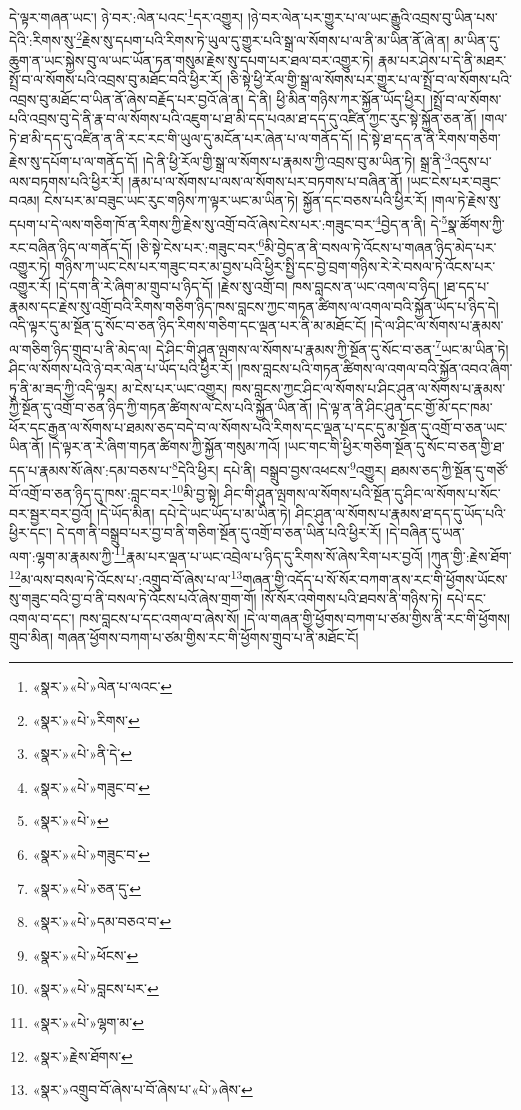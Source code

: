 དེ་ལྟར་གཞན་ཡང་། ཉེ་བར་:ལེན་པའང་\footnote{«སྣར་»«པེ་»ལེན་པ་ལའང་}དར་འགྱུར། །ཉེ་བར་ལེན་པར་གྱུར་པ་ལ་ཡང་རྒྱུའི་འབྲས་བུ་ཡིན་པས་དེའི་:རིགས་སུ་\footnote{«སྣར་»«པེ་»རིགས་}རྗེས་སུ་དཔག་པའི་རིགས་ཏེ་ཡུལ་དུ་གྱུར་པའི་སྒྲ་ལ་སོགས་པ་ལ་ནི་མ་ཡིན་ནོ་ཞེ་ན། མ་ཡིན་དུ་ཆུག་ན་ཡང་སྐྱེས་བུ་ལ་ཡང་ཡོན་ཏན་གསུམ་རྗེས་སུ་དཔག་པར་ཐལ་བར་འགྱུར་ཏེ། རྣམ་པར་ཤེས་པ་དེ་ནི་མཐར་སྤྲོ་བ་ལ་སོགས་པའི་འབྲས་བུ་མཐོང་བའི་ཕྱིར་རོ། །ཅི་སྟེ་ཕྱི་རོལ་གྱི་སྒྲ་ལ་སོགས་པར་གྱུར་པ་ལ་སྤྲོ་བ་ལ་སོགས་པའི་འབྲས་བུ་མཐོང་བ་ཡིན་ནོ་ཞེས་བརྗོད་པར་བྱའོ་ཞེ་ན། དེ་ནི། ཕྱི་མིན་གཉིས་ཀར་སྐྱོན་ཡོད་ཕྱིར། །སྤྲོ་བ་ལ་སོགས་པའི་འབྲས་བུ་དེ་ནི་རྣ་བ་ལ་སོགས་པའི་འཇུག་པ་ཐ་མི་དད་པའམ་ཐ་དད་དུ་འཛིན་ཀྱང་རུང་སྟེ་སྐྱོན་ཅན་ནོ། །གལ་ཏེ་ཐ་མི་དད་དུ་འཛིན་ན་ནི་རང་རང་གི་ཡུལ་དུ་མངོན་པར་ཞེན་པ་ལ་གནོད་དོ། །དེ་སྟེ་ཐ་དད་ན་ནི་རིགས་གཅིག་རྗེས་སུ་དཔོག་པ་ལ་གནོད་དོ། །དེ་ནི་ཕྱི་རོལ་གྱི་སྒྲ་ལ་སོགས་པ་རྣམས་ཀྱི་འབྲས་བུ་མ་ཡིན་ཏེ། སྒྲ་ནི་\footnote{«སྣར་»«པེ་»ནི་དེ་}འདུས་པ་ལས་བཏགས་པའི་ཕྱིར་རོ། །རྣམ་པ་ལ་སོགས་པ་ལས་ལ་སོགས་པར་བཏགས་པ་བཞིན་ནོ། །ཡང་ངེས་པར་བཟུང་བའམ། ངེས་པར་མ་བཟུང་ཡང་རུང་གཉིས་ཀ་ལྟར་ཡང་མ་ཡིན་ཏེ། སྐྱོན་དང་བཅས་པའི་ཕྱིར་རོ། །གལ་ཏེ་རྗེས་སུ་དཔག་པ་དེ་ལས་གཅིག་ཁོ་ན་རིགས་ཀྱི་རྗེས་སུ་འགྲོ་བའོ་ཞེས་ངེས་པར་:གཟུང་བར་\footnote{«སྣར་»«པེ་»གཟུང་བ་}བྱེད་ན་ནི། དེ་\footnote{«སྣར་»«པེ་»}སྣ་ཚོགས་ཀྱི་རང་བཞིན་ཉིད་ལ་གནོད་དོ། །ཅི་སྟེ་ངེས་པར་:གཟུང་བར་\footnote{«སྣར་»«པེ་»གཟུང་བ་}མི་བྱེད་ན་ནི་བསལ་ཏེ་འོངས་པ་གཞན་ཉིད་མེད་པར་འགྱུར་ཏེ། གཉིས་ཀ་ཡང་ངེས་པར་གཟུང་བར་མ་བྱས་པའི་ཕྱིར་སྤྱི་དང་བྱེ་བྲག་གཉིས་རེ་རེ་བསལ་ཏེ་འོངས་པར་འགྱུར་རོ། །དེ་དག་ནི་རེ་ཞིག་མ་གྲུབ་པ་ཉིད་དོ། །རྗེས་སུ་འགྲོ་བ། ཁས་བླངས་ན་ཡང་འགལ་བ་ཉིད། །ཐ་དད་པ་རྣམས་དང་རྗེས་སུ་འགྲོ་བའི་རིགས་གཅིག་ཉིད་ཁས་བླངས་ཀྱང་གཏན་ཚིགས་ལ་འགལ་བའི་སྐྱོན་ཡོད་པ་ཉིད་དེ། འདི་ལྟར་དུ་མ་སྔོན་དུ་སོང་བ་ཅན་ཉིད་རིགས་གཅིག་དང་ལྡན་པར་ནི་མ་མཐོང་ངོ། །དེ་ལ་ཤིང་ལ་སོགས་པ་རྣམས་ལ་གཅིག་ཉིད་གྲུབ་པ་ནི་མེད་ལ། དེ་ཤིང་གི་ཤུན་ལྤགས་ལ་སོགས་པ་རྣམས་ཀྱི་སྔོན་དུ་སོང་བ་ཅན་\footnote{«སྣར་»«པེ་»ཅན་དུ་}ཡང་མ་ཡིན་ཏེ། ཤིང་ལ་སོགས་པའི་ཉེ་བར་ལེན་པ་ཡོད་པའི་ཕྱིར་རོ། །ཁས་བླངས་པའི་གཏན་ཚིགས་ལ་འགལ་བའི་སྐྱོན་འབའ་ཞིག་ཏུ་ནི་མ་ཟད་ཀྱི་འདི་ལྟར། མ་ངེས་པར་ཡང་འགྱུར། ཁས་བླངས་ཀྱང་ཤིང་ལ་སོགས་པ་ཤིང་ཤུན་ལ་སོགས་པ་རྣམས་ཀྱི་སྔོན་དུ་འགྲོ་བ་ཅན་ཉིད་ཀྱི་གཏན་ཚིགས་ལ་ངེས་པའི་སྐྱོན་ཡིན་ནོ། །དེ་ལྟ་ན་ནི་ཤིང་ཤུན་དང་གྱོ་མོ་དང་ཁམ་ཕོར་དང་རྒྱན་ལ་སོགས་པ་ཐམས་ཅད་བདེ་བ་ལ་སོགས་པའི་རིགས་དང་ལྡན་པ་དང་དུ་མ་སྔོན་དུ་འགྲོ་བ་ཅན་ཡང་ཡིན་ནོ། །དེ་ལྟར་ན་རེ་ཞིག་གཏན་ཚིགས་ཀྱི་སྐྱོན་གསུམ་ཀའོ། །ཡང་གང་གི་ཕྱིར་གཅིག་སྔོན་དུ་སོང་བ་ཅན་གྱི་ཐ་དད་པ་རྣམས་སོ་ཞེས་:དམ་བཅས་པ་\footnote{«སྣར་»«པེ་»དམ་བཅའ་བ་}དེའི་ཕྱིར། དཔེ་ནི། བསྒྲུབ་བྱས་འཕངས་\footnote{«སྣར་»«པེ་»ཕོངས་}འགྱུར། ཐམས་ཅད་ཀྱི་སྔོན་དུ་གཙོ་བོ་འགྲོ་བ་ཅན་ཉིད་དུ་ཁས་:བླང་བར་\footnote{«སྣར་»«པེ་»བླངས་པར་}མི་བྱ་སྟེ། ཤིང་གི་ཤུན་ལྤགས་ལ་སོགས་པའི་སྔོན་དུ་ཤིང་ལ་སོགས་པ་སོང་བར་སྦྱར་བར་བྱའོ། །དེ་ཡོད་མིན། དཔེ་དེ་ཡང་ཡོད་པ་མ་ཡིན་ཏེ། ཤིང་ཤུན་ལ་སོགས་པ་རྣམས་ཐ་དད་དུ་ཡོད་པའི་ཕྱིར་དང་། དེ་དག་ནི་བསྒྲུབ་པར་བྱ་བ་ནི་གཅིག་སྔོན་དུ་འགྲོ་བ་ཅན་ཡིན་པའི་ཕྱིར་རོ། །དེ་བཞིན་དུ་ཡན་ལག་:ལྷག་མ་རྣམས་ཀྱི་\footnote{«སྣར་»«པེ་»ལྷག་མ་}རྣམ་པར་ལྡན་པ་ཡང་འབྲེལ་པ་ཉིད་དུ་རིགས་སོ་ཞེས་རིག་པར་བྱའོ། །ཀུན་གྱི་:རྗེས་ཐོག་\footnote{«སྣར་»རྗེས་ཐོགས་}མ་ལས་བསལ་ཏེ་འོངས་པ་:འགྲུབ་བོ་ཞེས་པ་ལ་\footnote{«སྣར་»འགྲུབ་བོ་ཞེས་པ་བོ་ཞེས་པ་«པེ་»ཞེས་}གཞན་གྱི་འདོད་པ་སོ་སོར་བཀག་ནས་རང་གི་ཕྱོགས་ཡོངས་སུ་གཟུང་བའི་བྱ་བ་ནི་བསལ་ཏེ་འོངས་པའོ་ཞེས་གྲག་གོ། །སོ་སོར་འགེགས་པའི་ཐབས་ནི་གཉིས་ཏེ། དཔེ་དང་འགལ་བ་དང་། ཁས་བླངས་པ་དང་འགལ་བ་ཞེས་སོ། །དེ་ལ་གཞན་གྱི་ཕྱོགས་བཀག་པ་ཙམ་གྱིས་ནི་རང་གི་ཕྱོགས། གྲུབ་མིན། གཞན་ཕྱོགས་བཀག་པ་ཙམ་གྱིས་རང་གི་ཕྱོགས་གྲུབ་པ་ནི་མཐོང་ངོ། 